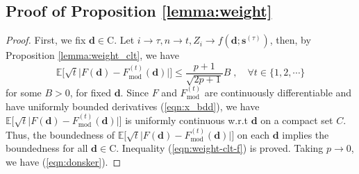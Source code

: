 \documentclass[final]{siamart1116}
\newcommand{\mb}[1]{\mathbf{#1}}
\def \E  {\mathbb{E}}
\begin{document}
\subsection{Proof of Proposition \ref{lemma:weight}}
\label{app:weight-clt-f}

\begin{proof}
First, we fix $\mb{d}\in\text{C}$.
Let $i\to\tau, n\to t, Z_i \to f(\mb{d};\mb{s}^{(\tau)})$, then, by Proposition \ref{lemma:weight_clt}, we have
\[
\E\Big[\sqrt{t}\big|F(\mb{d}) - F^{(t)}_{\mathrm{mod}}(\mb{d})\big|\Big] \leq \frac{p+1}{\sqrt{2p+1}}B \;, \quad \forall t \in \{1,2,\cdots\}
\]
for some $B>0$, for fixed $\mb{d}$. Since $F$ and $F^{(t)}_{\mathrm{mod}}$ are continuously differentiable and have uniformly bounded derivatives (\ref{eqn:x_bdd}), we have $\E\Big[\sqrt{t}\big|F(\mb{d}) - F^{(t)}_{\mathrm{mod}}(\mb{d})\big|\Big]$ is uniformly continuous w.r.t $\mb{d}$ on a compact set $C$. Thus, the boundedness of  $\E\Big[\sqrt{t}\big|F(\mb{d}) - F^{(t)}_{\mathrm{mod}}(\mb{d})\big|\Big]$ on each $\mb{d}$ implies the boundedness for all $\mb{d}\in \text{C}$. Inequality (\ref{eqn:weight-clt-f}) is proved. Taking $p\to0$, we have (\ref{eqn:donsker}).
\end{proof}
\end{document}
